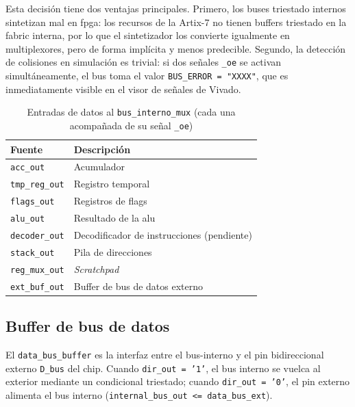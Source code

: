 \documentclass[%
    school=etsisi,%
    type=pfg,%
    degree=61CI,%
]{upm-report}
\newcommand{\vhdlfile}[1]{%
    \par\noindent{\small\sffamily\color{gray}Fichero: \texttt{#1}}\par\smallskip
}
\begin{document}
Esta decisión tiene dos ventajas principales.  Primero, los buses triestado
internos sintetizan mal en \acrshort{fpga}: los recursos de la Artix-7 no
tienen buffers triestado en la fabric interna, por lo que el sintetizador
los convierte igualmente en multiplexores, pero de forma implícita y menos
predecible.  Segundo, la detección de colisiones en simulación es trivial:
si dos señales \texttt{\_oe} se activan simultáneamente, el bus toma el valor
\texttt{BUS\_ERROR = "XXXX"}, que es inmediatamente visible en el visor de
señales de Vivado.

\begin{table}[H]
\centering
\caption{Entradas de datos al \texttt{bus\_interno\_mux} (cada una acompañada de su señal \texttt{\_oe})}
\label{tab:bus-mux}
\begin{tabularx}{\textwidth}{@{}lX@{}}
\toprule
\textbf{Fuente}   & \textbf{Descripción} \\
\midrule
\texttt{acc\_out}      & Acumulador \\
\texttt{tmp\_reg\_out} & Registro temporal \\
\texttt{flags\_out}    & Registros de flags \\
\texttt{alu\_out}      & Resultado de la \acrshort{alu} \\
\texttt{decoder\_out}  & Decodificador de instrucciones (pendiente) \\
\texttt{stack\_out}    & Pila de direcciones \\
\texttt{reg\_mux\_out} & \textit{Scratchpad} \\
\texttt{ext\_buf\_out} & Buffer de bus de datos externo \\
\bottomrule
\end{tabularx}
\end{table}

\subsection{Buffer de bus de datos}
\label{ss:data-bus-buffer}
\vhdlfile{data\_bus\_buffer.vhd}

El \texttt{data\_bus\_buffer} es la interfaz entre el \gls{bus-interno} y el
pin bidireccional externo \texttt{D\_bus} del chip.  Cuando \texttt{dir\_out = '1'},
el bus interno se vuelca al exterior mediante un condicional triestado; cuando
\texttt{dir\_out = '0'}, el pin externo alimenta el bus interno
(\texttt{internal\_bus\_out <= data\_bus\_ext}).
\end{document}
